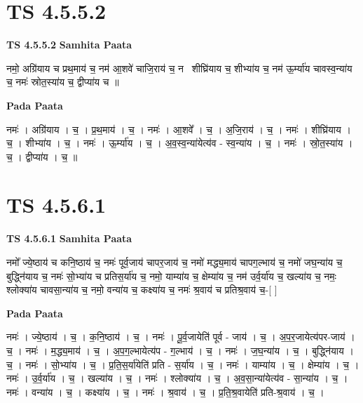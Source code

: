\documentclass[17pt]{extarticle}
\begin{document}

\section{ TS 4.5.5.2 }

\textbf{TS 4.5.5.2 } \newline
\textbf{Samhita Paata} \newline

नमो॒ अग्रि॑याय च प्रथ॒माय॑ च॒ नम॑ आ॒शवे॑ चाजि॒राय॑ च॒ नमः᳡शीघ्रि॑याय च॒ शीभ्या॑य च॒ नम॑ ऊ॒र्म्या॑य चावस्व॒न्या॑य च॒ नमः॑ स्रोत॒स्या॑य च॒ द्वीप्या॑य च ॥ \newline

\textbf{Pada Paata} \newline

नमः॑ । अग्रि॑याय । च॒ । प्र॒थ॒माय॑ । च॒ । नमः॑ । आ॒शवे᳚ । च॒ । अ॒जि॒राय॑ । च॒ । नमः॑ । शीघ्रि॑याय । च॒ । शीभ्या॑य । च॒ । नमः॑ । ऊ॒र्म्या॑य । च॒ । अ॒व॒स्व॒न्या॑येत्य॑व - स्व॒न्या॑य । च॒ । नमः॑ । स्रो॒त॒स्या॑य । च॒ । द्वीप्या॑य । च॒ ॥  \newline





\section{ TS 4.5.6.1 }

\textbf{TS 4.5.6.1 } \newline
\textbf{Samhita Paata} \newline

नमो᳚ ज्ये॒ष्ठाय॑ च कनि॒ष्ठाय॑ च॒ नमः॑ पूर्व॒जाय॑ चापर॒जाय॑ च॒ नमो॑ मद्ध्य॒माय॑ चापग॒ल्भाय॑ च॒ नमो॑ जघ॒न्या॑य च॒ बुद्ध्नि॑याय च॒ नमः॑ सो॒भ्या॑य च प्रतिस॒र्या॑य च॒ नमो॒ याम्या॑य च॒ क्षेम्या॑य च॒ नम॑ उर्व॒र्या॑य च॒ खल्या॑य च॒ नमः॒ श्लोक्या॑य चावसा॒न्या॑य च॒ नमो॒ वन्या॑य च॒ कक्ष्या॑य च॒ नमः॑ श्र॒वाय॑ च प्रतिश्र॒वाय॑ च॒-[  ] \newline

\textbf{Pada Paata} \newline

नमः॑ । ज्ये॒ष्ठाय॑ । च॒ । क॒नि॒ष्ठाय॑ । च॒ । नमः॑ । पू॒र्व॒जायेति॑ पूर्व - जाय॑ । च॒ । अ॒प॒र॒जायेत्य॑पर-जाय॑ । च॒ । नमः॑ । म॒द्ध्य॒माय॑ । च॒ । अ॒प॒ग॒ल्भायेत्य॑प - ग॒ल्भाय॑ । च॒ । नमः॑ । ज॒घ॒न्या॑य । च॒ । बुद्ध्नि॑याय । च॒ । नमः॑ । सो॒भ्या॑य । च॒ । प्र॒ति॒स॒र्या॑येति॑ प्रति - स॒र्या॑य । च॒ । नमः॑ । याम्या॑य । च॒ । क्षेम्या॑य । च॒ । नमः॑ । उ॒र्व॒र्या॑य । च॒ । खल्या॑य । च॒ । नमः॑ । श्लोक्या॑य । च॒ । अ॒व॒सा॒न्या॑येत्य॑व - सा॒न्या॑य । च॒ । नमः॑ । वन्या॑य । च॒ । कक्ष्या॑य । च॒ । नमः॑ । श्र॒वाय॑ । च॒ । प्र॒ति॒श्र॒वायेति॑ प्रति-श्र॒वाय॑ । च॒ ।  \newline
\end{document}
